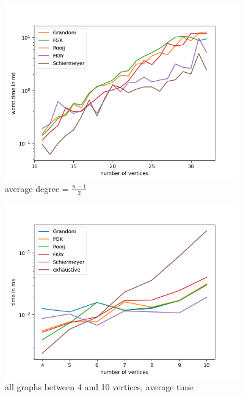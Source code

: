 \begin{figure}[H]
    \centering
    \includegraphics[width=0.9\textwidth]{figures/dense_worst.png}
    \caption{average degree = $\frac{n-1}{2}$}
    \label{fig:dense_worst}
\end{figure}

\begin{figure}[H]
    \centering
    \includegraphics[width=0.9\textwidth]{figures/small_all_average.png}
    \caption{all graphs between 4 and 10 vertices, average time}
    \label{fig:small}
\end{figure}